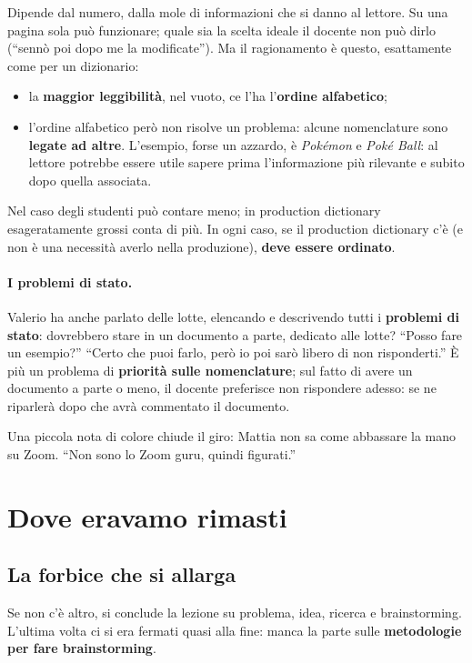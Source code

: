 Dipende dal numero, dalla mole di informazioni che si danno al lettore. Su
una pagina sola può funzionare; quale sia la scelta ideale il docente non
può dirlo (``sennò poi dopo me la modificate''). Ma il ragionamento è
questo, esattamente come per un dizionario:
\begin{itemize}
  \item la \textbf{maggior leggibilità}, nel vuoto, ce l'ha l'\textbf{ordine
        alfabetico};
  \item l'ordine alfabetico però non risolve un problema: alcune
        nomenclature sono \textbf{legate ad altre}. L'esempio, forse un
        azzardo, è \emph{Pokémon} e \emph{Poké Ball}: al lettore potrebbe
        essere utile sapere prima l'informazione più rilevante e subito
        dopo quella associata.
\end{itemize}
Nel caso degli studenti può contare meno; in production dictionary
esageratamente grossi conta di più. In ogni caso, se il production dictionary
c'è (e non è una necessità averlo nella produzione), \textbf{deve essere
ordinato}.

\paragraph{I problemi di stato.} Valerio ha anche parlato delle lotte,
elencando e descrivendo tutti i \textbf{problemi di stato}: dovrebbero stare
in un documento a parte, dedicato alle lotte? ``Posso fare un esempio?''
``Certo che puoi farlo, però io poi sarò libero di non risponderti.'' È più
un problema di \textbf{priorità sulle nomenclature}; sul fatto di avere un
documento a parte o meno, il docente preferisce non rispondere adesso: se ne
riparlerà dopo che avrà commentato il documento.

Una piccola nota di colore chiude il giro: Mattia non sa come abbassare la
mano su Zoom. ``Non sono lo Zoom guru, quindi figurati.''

\section{Dove eravamo rimasti}
\label{sec:ripresa-gd6}

\subsection{La forbice che si allarga}

Se non c'è altro, si conclude la lezione su problema, idea, ricerca e
brainstorming. L'ultima volta ci si era fermati quasi alla fine: manca
la parte sulle \textbf{metodologie per fare brainstorming}.

